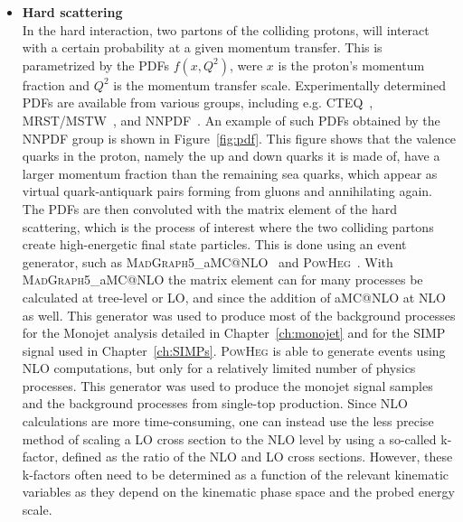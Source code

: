 \begin{itemize}
 \item[] \textbf{Hard scattering}\\
 In the hard interaction, two partons of the colliding protons, will interact with a certain probability at a given momentum transfer. This is parametrized by the \acp{PDF} $f(x, Q^2)$, were $x$ is the proton's momentum fraction and $Q^2$ is the momentum transfer scale. Experimentally determined \acp{PDF} are available from various groups, including e.g. CTEQ~\cite{Pumplin:2002vw}, MRST/MSTW~\cite{Martin:2009iq}, and NNPDF~\cite{Ball:2014uwa}. An example of such \acp{PDF} obtained by the NNPDF group is shown in Figure~\ref{fig:pdf}. This figure shows that the valence quarks in the proton, namely the up and down quarks it is made of, have a larger momentum fraction than the remaining sea quarks, which appear as virtual quark-antiquark pairs forming from gluons and annihilating again. The \acp{PDF} are then convoluted with the matrix element of the hard scattering, which is the process of interest where the two colliding partons create high-energetic final state particles. This is done using an event generator, such as \textsc{MadGraph5\_}a\textsc{MC@NLO}~\cite{Alwall:2014hca} and \textsc{PowHeg}~\cite{Frixione:2007vw}. With \textsc{MadGraph5\_}a\textsc{MC@NLO} the matrix element can for many processes be calculated at tree-level or \ac{LO}, and since the addition of a\textsc{MC@NLO} at \ac{NLO} as well. This generator was used to produce most of the background processes for the Monojet analysis detailed in Chapter~\ref{ch:monojet} and for the \ac{SIMP} signal used in Chapter~\ref{ch:SIMPs}. \textsc{PowHeg} is able to generate events using \ac{NLO} computations, but only for a relatively limited number of physics processes. This generator was used to produce the monojet signal samples and the background processes from single-top production. Since \ac{NLO} calculations are more time-consuming, one can instead use the less precise method of scaling a \ac{LO} cross section to the \ac{NLO} level by using a so-called k-factor, defined as the ratio of the \ac{NLO} and \ac{LO} cross sections. However, these k-factors often need to be determined as a function of the relevant kinematic variables as they depend on the kinematic phase space and the probed energy scale.


\end{itemize}
